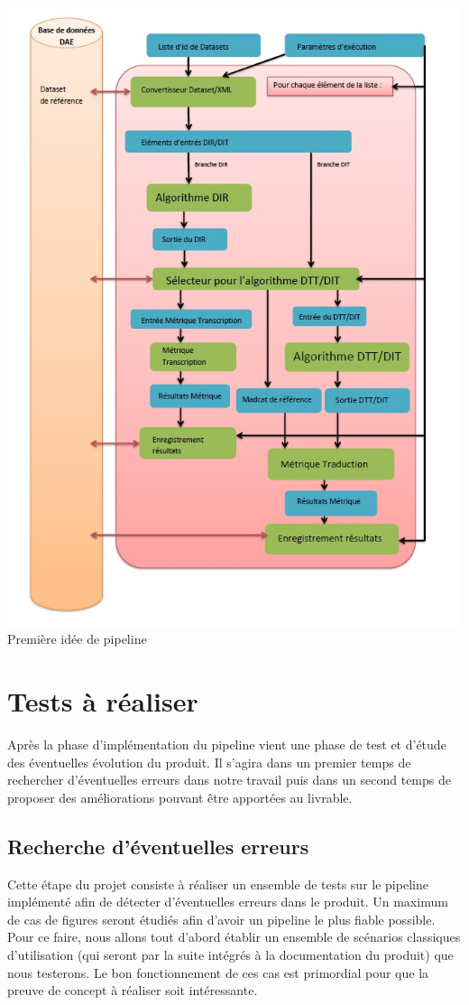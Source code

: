 \begin{center}
\includegraphics{pipeline}
Première idée de pipeline
\end{center}

\section{Tests à réaliser}

Après la phase d'implémentation du pipeline vient une phase de test et d'étude des éventuelles évolution du produit. Il s'agira dans un premier temps de rechercher d'éventuelles erreurs dans notre travail puis dans un second temps de proposer des améliorations pouvant être apportées au livrable.

\subsection{Recherche d'éventuelles erreurs}
Cette étape du projet consiste à réaliser un ensemble de tests sur le pipeline implémenté afin de détecter d'éventuelles erreurs dans le produit. Un maximum de cas de figures seront étudiés afin d'avoir un pipeline le plus fiable possible. Pour ce faire, nous allons tout d'abord établir un ensemble de scénarios classiques d'utilisation (qui seront par la suite intégrés à la documentation du produit) que nous testerons. Le bon fonctionnement de ces cas est primordial pour que la preuve de
concept à réaliser soit intéressante.   

